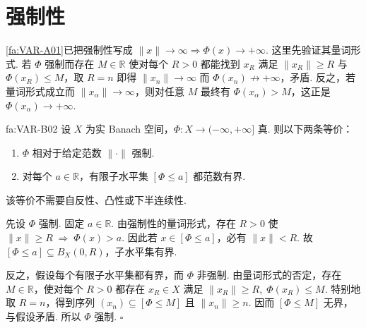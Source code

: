\section{强制性}\label{sec:iii06-coercivity}

\autoref{fa:VAR-A01}已把强制性写成 \(\displaystyle\|x\|\to\infty\Rightarrow\Phi(x)\to+\infty\). 这里先验证其量词形式. 若 \(\displaystyle\Phi\) 强制而存在 \(\displaystyle M\in\mathbb R\) 使对每个 \(\displaystyle R>0\) 都能找到 \(\displaystyle x_R\) 满足 \(\displaystyle\|x_R\|\geqslant R\) 与 \(\displaystyle\Phi(x_R)\leqslant M\)，取 \(\displaystyle R=n\) 即得 \(\displaystyle\|x_n\|\to\infty\) 而 \(\displaystyle\Phi(x_n)\not\to+\infty\)，矛盾. 反之，若量词形式成立而 \(\displaystyle\|x_\alpha\|\to\infty\)，则对任意 \(\displaystyle M\) 最终有 \(\displaystyle\Phi(x_\alpha)>M\)，这正是 \(\displaystyle\Phi(x_\alpha)\to+\infty\).

\begin{FATheorem}[B][强制性与有限子水平集有界性]{fa:VAR-B02}
设 \(\displaystyle X\) 为实 Banach 空间，\(\displaystyle\Phi:X\to(-\infty,+\infty]\) 真. 则以下两条等价：
\begin{enumerate}
\item \(\displaystyle\Phi\) 相对于给定范数 \(\displaystyle\|\cdot\|\) 强制.
\item 对每个 \(\displaystyle a\in\mathbb R\)，有限子水平集 \(\displaystyle[\Phi\leqslant a]\) 都范数有界.
\end{enumerate}
该等价不需要自反性、凸性或下半连续性.
\end{FATheorem}

\begin{FAProof}
先设 \(\displaystyle\Phi\) 强制. 固定 \(\displaystyle a\in\mathbb R\). 由强制性的量词形式，存在 \(\displaystyle R>0\) 使
\(\displaystyle \|x\|\geqslant R \;\Longrightarrow\; \Phi(x)>a.\)
因此若 \(\displaystyle x\in[\Phi\leqslant a]\)，必有 \(\displaystyle\|x\|<R\). 故 \(\displaystyle[\Phi\leqslant a]\subseteq B_X(0,R)\)，子水平集有界.

反之，假设每个有限子水平集都有界，而 \(\displaystyle\Phi\) 非强制. 由量词形式的否定，存在 \(\displaystyle M\in\mathbb R\)，使对每个 \(\displaystyle R>0\) 都存在 \(\displaystyle x_R\in X\) 满足
\(\displaystyle \|x_R\|\geqslant R, \; \Phi(x_R)\leqslant M.\)
特别地取 \(\displaystyle R=n\)，得到序列 \(\displaystyle(x_n)\subseteq[\Phi\leqslant M]\) 且 \(\displaystyle\|x_n\|\geqslant n\). 因而 \(\displaystyle[\Phi\leqslant M]\) 无界，与假设矛盾. 所以 \(\displaystyle\Phi\) 强制.
\hfill\(\square\)

\end{FAProof}

